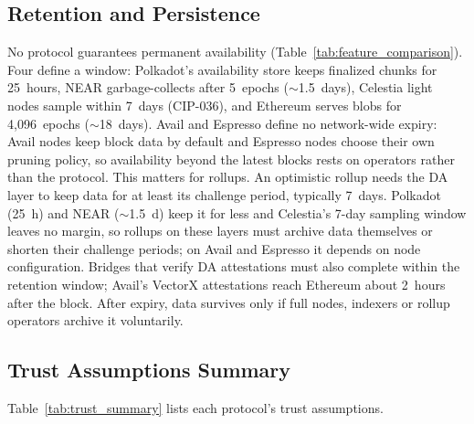 \subsection{Retention and Persistence}
\label{sec:security-retention}

No protocol guarantees permanent availability (Table~\ref{tab:feature_comparison}). Four define a window: Polkadot's availability store keeps finalized chunks for 25~hours, NEAR garbage-collects after 5~epochs ($\sim$1.5~days), Celestia light nodes sample within 7~days (CIP-036), and Ethereum serves blobs for 4{,}096~epochs ($\sim$18~days). Avail and Espresso define no network-wide expiry: Avail nodes keep block data by default and Espresso nodes choose their own pruning policy, so availability beyond the latest blocks rests on operators rather than the protocol.
This matters for rollups.
An optimistic rollup needs the DA layer to keep data for at least its challenge period, typically 7~days.
Polkadot (25~h) and NEAR ($\sim$1.5~d) keep it for less and Celestia's 7-day sampling window leaves no margin, so rollups on these layers must archive data themselves or shorten their challenge periods; on Avail and Espresso it depends on node configuration.
Bridges that verify DA attestations must also complete within the retention window; Avail's VectorX attestations reach Ethereum about 2~hours after the block.
After expiry, data survives only if full nodes, indexers or rollup operators archive it voluntarily.

\subsection{Trust Assumptions Summary}
\label{sec:security-trust}

Table~\ref{tab:trust_summary} lists each protocol's trust assumptions.

